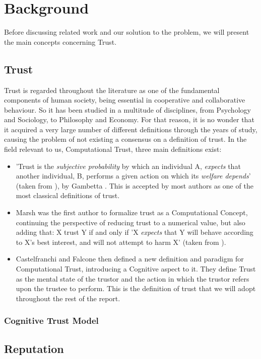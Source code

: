 \section{Background}
\label{sec:Background}



Before discussing related work and our solution to the problem, we will present the main concepts concerning Trust.

\subsection{Trust}
\label{subsec:Trust}
Trust is regarded throughout the literature as one of the fundamental components of human society, being essential in cooperative and collaborative behaviour. So it has been studied in a multitude of disciplines, from Psychology and Sociology, to Philosophy and Economy\cite{Jones1997, Sabater2005}. For that reason, it is no wonder that it acquired a very large number of different definitions through the years of study, causing the problem of not existing a consensus on a definition of trust\cite{Castelfranchi2010}. In the field relevant to us, Computational Trust, three main definitions exist:
\begin{itemize}
	\item 'Trust is the \textit{subjective probability} by which an individual A, \textit{expects} that another individual, B, performs a given action on which its \textit{welfare depends}' (taken from \cite{Castelfranchi2010}), by Gambetta \cite{Gambetta2015}. This is accepted by most authors as one of the most classical definitions of trust.
	
	\item Marsh was the first author to formalize trust as a Computational Concept\cite{Marsh1994}, continuing the perspective of reducing trust to a numerical value, but also adding that: X trust Y if and only if 'X \textit{expects} that Y will behave according to X's best interest, and will not attempt to harm X' (taken from \cite{Castelfranchi2010}).
	
	\item Castelfranchi and Falcone then defined a new definition and paradigm for Computational Trust, introducing a Cognitive aspect to it\cite{Castelfranchi1998}. They define Trust as the mental state of the trustor and the action in which the trustor refers upon the trustee to perform. This is the definition of trust that we will adopt throughout the rest of the report.
\end{itemize}

\subsubsection{Cognitive Trust Model}


\subsection{Reputation}
\label{subsec:Reputation}
